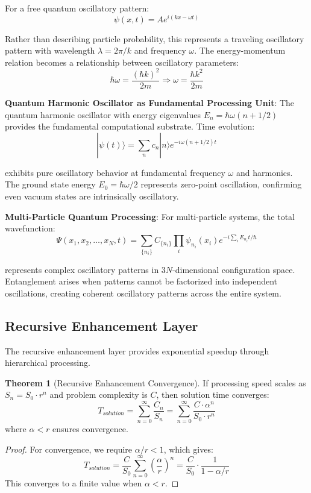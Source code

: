 \documentclass[12pt,a4paper]{article}
\theoremstyle{definition}
\newtheorem{theorem}{Theorem}[section]
\begin{document}
{For a free quantum oscillatory pattern:
$$\psi(x,t) = A e^{i(kx - \omega t)}$$

Rather than describing particle probability, this represents a traveling oscillatory pattern with wavelength $\lambda = 2\pi/k$ and frequency $\omega$. The energy-momentum relation becomes a relationship between oscillatory parameters:
$$\hbar \omega = \frac{(\hbar k)^2}{2m} \Rightarrow \omega = \frac{\hbar k^2}{2m}$$

\textbf{Quantum Harmonic Oscillator as Fundamental Processing Unit}: The quantum harmonic oscillator with energy eigenvalues $E_n = \hbar\omega(n + 1/2)$ provides the fundamental computational substrate. Time evolution:
$$|\psi(t)\rangle = \sum_n c_n |n\rangle e^{-i\omega(n + 1/2)t}$$

exhibits pure oscillatory behavior at fundamental frequency $\omega$ and harmonics. The ground state energy $E_0 = \hbar\omega/2$ represents zero-point oscillation, confirming even vacuum states are intrinsically oscillatory.

\textbf{Multi-Particle Quantum Processing}: For multi-particle systems, the total wavefunction:
$$\Psi(x_1, x_2, \ldots, x_N, t) = \sum_{\{n_i\}} C_{\{n_i\}} \prod_i \psi_{n_i}(x_i) e^{-i\sum_i E_{n_i} t/\hbar}$$

represents complex oscillatory patterns in $3N$-dimensional configuration space. Entanglement arises when patterns cannot be factorized into independent oscillations, creating coherent oscillatory patterns across the entire system.

\subsection{Recursive Enhancement Layer}

The recursive enhancement layer provides exponential speedup through hierarchical processing.

\begin{theorem}[Recursive Enhancement Convergence]
If processing speed scales as $S_n = S_0 \cdot r^n$ and problem complexity is $C$, then solution time converges:
\begin{equation}
T_{solution} = \sum_{n=0}^{\infty} \frac{C_n}{S_n} = \sum_{n=0}^{\infty} \frac{C \cdot \alpha^n}{S_0 \cdot r^n}
\end{equation}
where $\alpha < r$ ensures convergence.
\end{theorem}

\begin{proof}
For convergence, we require $\alpha/r < 1$, which gives:
\begin{equation}
T_{solution} = \frac{C}{S_0} \sum_{n=0}^{\infty} \left(\frac{\alpha}{r}\right)^n = \frac{C}{S_0} \cdot \frac{1}{1-\alpha/r}
\end{equation}
This converges to a finite value when $\alpha < r$.
\end{proof}

}
\end{document}
